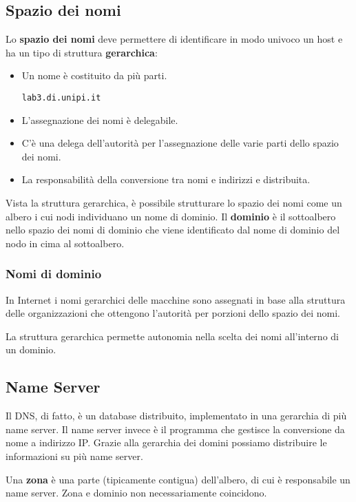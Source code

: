\subsection{Spazio dei nomi}
Lo \textbf{spazio dei nomi} deve permettere di identificare in modo univoco un host e ha un tipo
di struttura \textbf{gerarchica}:
\begin{itemize}
	\item Un nome è costituito da più parti.
	      \begin{center} \verb|lab3.di.unipi.it| \end{center}
	\item L'assegnazione dei nomi è delegabile.
	\item C'è una delega dell'autorità per l'assegnazione delle varie parti dello spazio dei nomi.
	\item La responsabilità della conversione tra nomi e indirizzi e distribuita.
\end{itemize}
Vista la struttura gerarchica, è possibile strutturare lo spazio dei nomi come un albero i cui
nodi individuano un nome di dominio. Il \textbf{dominio} è il sottoalbero nello spazio dei nomi di
dominio che viene identificato dal nome di dominio del nodo in cima al sottoalbero.

\subsubsection{Nomi di dominio}
In Internet i nomi gerarchici delle macchine sono assegnati in base alla struttura delle
organizzazioni che ottengono l'autorità per porzioni dello spazio dei nomi.

La struttura gerarchica permette autonomia nella scelta dei nomi all'interno di un dominio.

\subsection{Name Server}
Il DNS, di fatto, è un database distribuito, implementato in una gerarchia di più name server. Il
name server invece è il programma che gestisce la conversione da nome a indirizzo IP. Grazie alla
gerarchia dei domini possiamo distribuire le informazioni su più name server.

Una \textbf{zona} è una parte (tipicamente contigua) dell'albero, di cui è responsabile un name
server. Zona e dominio non necessariamente coincidono.

